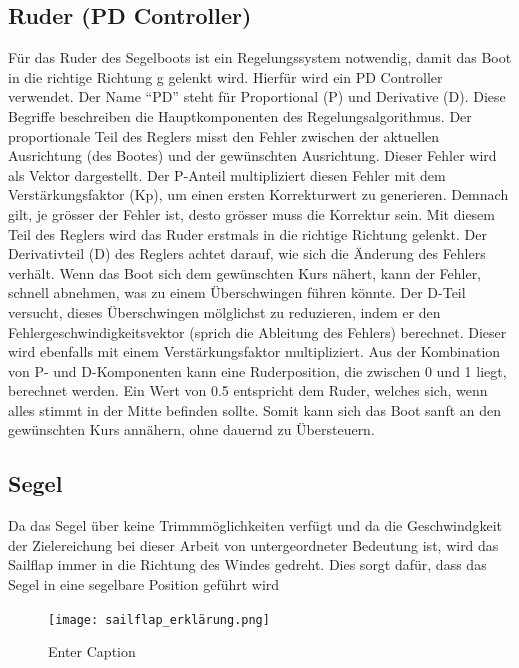 \subsection{Ruder (PD Controller)}
Für das Ruder des Segelboots ist ein Regelungssystem notwendig, damit das Boot in die richtige Richtung g gelenkt wird. Hierfür wird ein PD Controller verwendet. Der Name \enquote{PD} steht für Proportional (P) und Derivative (D). Diese Begriffe beschreiben die Hauptkomponenten des Regelungsalgorithmus. Der proportionale Teil des Reglers misst den Fehler zwischen der aktuellen Ausrichtung (des Bootes) und der gewünschten Ausrichtung. Dieser Fehler wird als Vektor dargestellt. Der P-Anteil multipliziert diesen Fehler mit dem Verstärkungsfaktor (Kp), um einen ersten Korrekturwert zu generieren. Demnach gilt, je grösser der Fehler ist, desto grösser muss die Korrektur sein. Mit diesem Teil des Reglers wird das Ruder erstmals in die richtige Richtung gelenkt. Der Derivativteil (D) des Reglers achtet darauf, wie sich die Änderung des Fehlers verhält. Wenn das Boot sich dem gewünschten Kurs nähert, kann der Fehler, schnell abnehmen, was zu einem Überschwingen führen könnte. Der D-Teil versucht, dieses Überschwingen mölglichst zu reduzieren, indem er den Fehlergeschwindigkeitsvektor (sprich die Ableitung des Fehlers) berechnet. Dieser wird ebenfalls mit einem Verstärkungsfaktor multipliziert. Aus der Kombination von P- und D-Komponenten kann eine Ruderposition, die zwischen 0 und 1 liegt, berechnet werden. Ein Wert von 0.5 entspricht dem Ruder, welches sich, wenn alles stimmt in der Mitte befinden sollte. Somit kann sich das Boot sanft an den gewünschten Kurs annähern, ohne dauernd zu Übersteuern. 
\subsection{Segel}
Da das Segel über keine Trimmmöglichkeiten verfügt und da die Geschwindgkeit der Zielereichung bei dieser Arbeit von untergeordneter Bedeutung ist, wird das Sailflap immer in die Richtung des Windes gedreht. Dies sorgt dafür, dass das Segel in eine segelbare Position geführt wird 

\begin{figure}[H]
    \centering
    \texttt{[image: sailflap\_erklärung.png]}
    \caption{Enter Caption}
    \label{fig:enter-label}
\end{figure}









